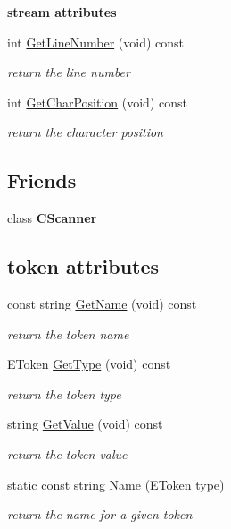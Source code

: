 \begin{Indent}{\bf stream attributes}\par
\begin{DoxyCompactItemize}
\item 
int \hyperlink{classCToken_afe53beb1bf5c9d0f9a2bc582040f919e}{Get\-Line\-Number} (void) const 
\begin{DoxyCompactList}\small\item\em return the line number \end{DoxyCompactList}\item 
int \hyperlink{classCToken_a07c102222df212345d980197ad092064}{Get\-Char\-Position} (void) const 
\begin{DoxyCompactList}\small\item\em return the character position \end{DoxyCompactList}\end{DoxyCompactItemize}
\end{Indent}
\subsection*{Friends}
\begin{DoxyCompactItemize}
\item 
\hypertarget{classCToken_af4936a9beeeec3e288fbbd3c14a9fe9d}{class {\bfseries C\-Scanner}}\label{classCToken_af4936a9beeeec3e288fbbd3c14a9fe9d}

\end{DoxyCompactItemize}
\subsection*{token attributes}
\begin{DoxyCompactItemize}
\item 
const string \hyperlink{classCToken_a04765417b8649e0380b1ff1cf3988ada}{Get\-Name} (void) const 
\begin{DoxyCompactList}\small\item\em return the token name \end{DoxyCompactList}\item 
E\-Token \hyperlink{classCToken_a07a01d5cedb9351c87192d3dc5f0564a}{Get\-Type} (void) const 
\begin{DoxyCompactList}\small\item\em return the token type \end{DoxyCompactList}\item 
string \hyperlink{classCToken_a06bfdd3197001f8c37cfdf93e135a836}{Get\-Value} (void) const 
\begin{DoxyCompactList}\small\item\em return the token value \end{DoxyCompactList}\item 
static const string \hyperlink{classCToken_a14cc3f3cc57965bb3414f62b370d7759}{Name} (E\-Token type)
\begin{DoxyCompactList}\small\item\em return the name for a given token \end{DoxyCompactList}\end{DoxyCompactItemize}


